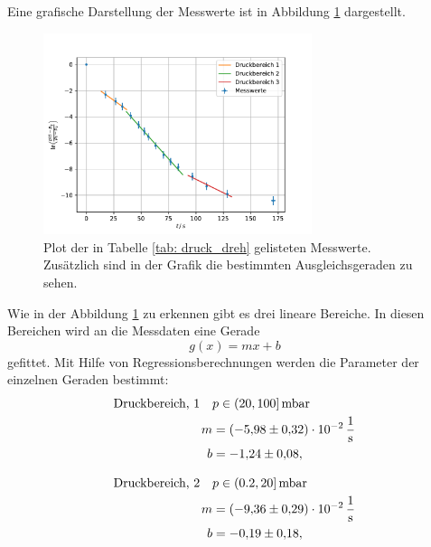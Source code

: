 Eine grafische Darstellung der Messwerte ist in Abbildung \ref{fig: druck_dreh} dargestellt.

\FloatBarrier
\begin{figure}[h]
  \centering
  \includegraphics[width=0.7\textwidth]{../Messdaten/plots/dreh/druckplot_drehschieber.pdf}
  \caption{Plot der in Tabelle \ref{tab: druck_dreh} gelisteten Messwerte. Zusätzlich sind in der Grafik die bestimmten Ausgleichsgeraden zu sehen.}
  \label{fig: druck_dreh}
\end{figure}
\FloatBarrier

Wie in der Abbildung \ref{fig: druck_dreh} zu erkennen gibt es drei lineare Bereiche. %
In diesen Bereichen wird an die Messdaten eine Gerade
\begin{equation}
  \label{eq: geradengleichung}
  g(x)=mx+b
\end{equation}
gefittet. Mit Hilfe von Regressionsberechnungen werden die Parameter der einzelnen Geraden bestimmt:
\begin{align}
  \label{eq: regression_dreh_druck_1}
  \begin{aligned}
  \text{Druckbereich, 1} \quad  &p\in(20,100]\,\si{\milli\bar} \\
  m&=\SI{-5.98\pm0.32 e-2}{\per\second} \\
  b&=\num{-1.24 \pm0.08 },
\end{aligned}
\end{align}

\begin{align}
  \label{eq: regression_dreh_druck_2}
  \begin{aligned}
  \text{Druckbereich, 2} \quad  &p\in(0.2,20]\,\si{\milli\bar} \\
  m&=\SI{-9.36\pm0.29 e-2}{\per\second} \\
  b&=\num{-0.19 \pm0.18 },
\end{aligned}
\end{align}

